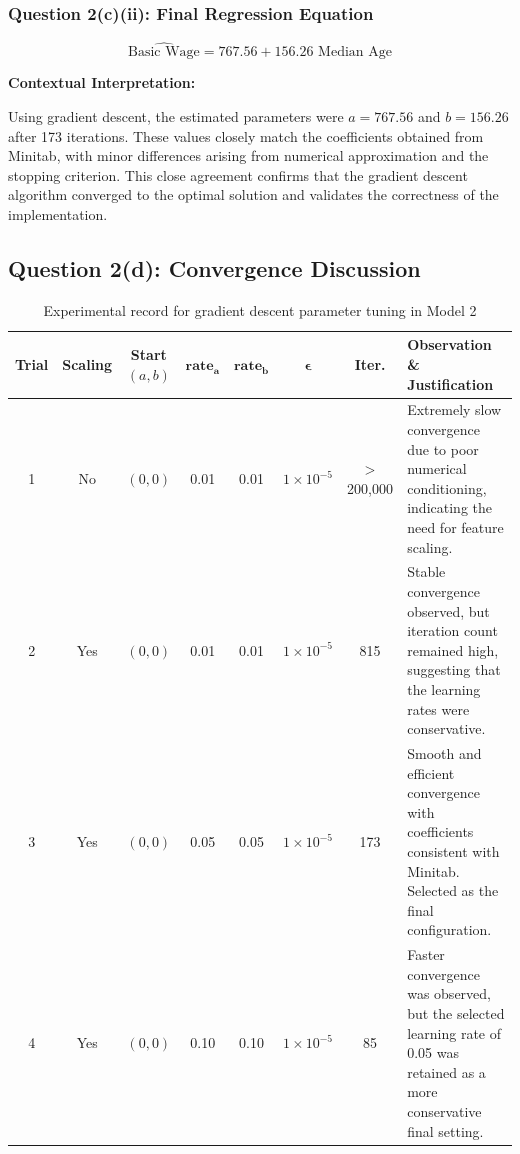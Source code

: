 \documentclass[12pt,a4paper,oneside]{report}
\begin{document}
\subsubsection{Question 2(c)(ii): Final Regression Equation}

\[
\widehat{\text{Basic Wage}} = 767.56 + 156.26 \text{ Median Age}
\]

\textbf{Contextual Interpretation:}

Using gradient descent, the estimated parameters were $a = 767.56$ and
$b = 156.26$ after 173 iterations. These values closely match the
coefficients obtained from Minitab, with minor differences arising from
numerical approximation and the stopping criterion. This close agreement
confirms that the gradient descent algorithm converged to the optimal
solution and validates the correctness of the implementation.

\subsection{Question 2(d): Convergence Discussion}

\begin{table}[H]
\centering
\scriptsize
\setlength{\tabcolsep}{3pt}
\caption{Experimental record for gradient descent parameter tuning in Model 2}
\label{tab:gd_experiment_record}
\begin{tabular}{|c|c|c|c|c|c|c|p{4.2cm}|}
\hline
\textbf{Trial} &
\textbf{Scaling} &
\textbf{Start $(a,b)$} &
$\boldsymbol{\text{rate}_a}$ &
$\boldsymbol{\text{rate}_b}$ &
$\boldsymbol{\epsilon}$ &
\textbf{Iter.} &
\textbf{Observation \& Justification} \\
\hline
1 & No & $(0,0)$ & 0.01 & 0.01 & $1\times10^{-5}$ &
$>$200{,}000 &
Extremely slow convergence due to poor numerical conditioning, indicating the need
for feature scaling. \\
\hline
2 & Yes & $(0,0)$ & 0.01 & 0.01 & $1\times10^{-5}$ &
815 &
Stable convergence observed, but iteration count remained high, suggesting that the
learning rates were conservative. \\
\hline
3 & Yes & $(0,0)$ & 0.05 & 0.05 & $1\times10^{-5}$ &
173 &
Smooth and efficient convergence with coefficients consistent with Minitab. Selected
as the final configuration. \\
\hline
4 & Yes & $(0,0)$ & 0.10 & 0.10 & $1\times10^{-5}$ &
85 &
Faster convergence was observed, but the selected learning rate of 0.05 was retained
as a more conservative final setting. \\
\hline
\end{tabular}
\end{table}
\end{document}
